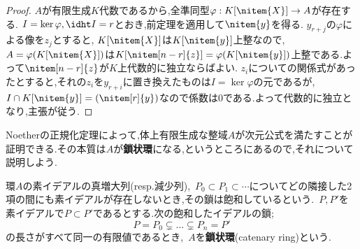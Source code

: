 \begin{proof}
	$A$が有限生成$K$代数であるから,全準同型$\varphi:K[\nitem{X}]\to A$が存在する. $I=\ker\varphi,\idht I=r$とおき,前定理を適用して$\nitem{y}$を得る. $y_{r+j}$の$\varphi$による像を$z_j$とすると, $K[\nitem{X}]$は$K[\nitem{y}]$上整なので, $A=\varphi(K[\nitem{X}])$は$K[\nitem[n-r]{z}]=\varphi(K[\nitem{y}])$上整である.よって$\nitem[n-r]{z}$が$K$上代数的に独立ならばよい. $z_i$についての関係式があったとすると,それの$z_i$を$y_{r+i}$に置き換えたものは$I=\ker\varphi$の元であるが, $I\cap K[\nitem{y}]=(\nitem[r]{y})$なので係数は0である.よって代数的に独立となり,主張が従う.
\end{proof}

%
%
%	
%		
%		
%		

Noetherの正規化定理によって,体上有限生成な整域$A$が次元公式を満たすことが証明できる.その本質は$A$が\textbf{鎖状環}になる,というところにあるので,それについて説明しよう.
\begin{defi}[鎖状環]
	環$A$の素イデアルの真増大列(resp.減少列),~$P_0\subset P_1\subset\cdots$についてどの隣接した2項の間にも素イデアルが存在しないとき,その鎖は飽和しているという.~$P,P'$を素イデアルで$P\subset P'$であるとする.次の飽和したイデアルの鎖;
	\[P=P_0\subsetneq\dots\subsetneq P_n= P'\]
	の長さがすべて同一の有限値であるとき,~$A$を\textbf{鎖状環}(catenary ring)という.
\end{defi}


